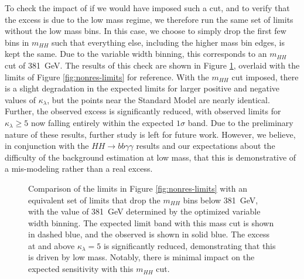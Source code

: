 To check the impact of if we would have imposed such a cut, and to verify that the excess is due to the low mass regime, 
we therefore run the same set of limits without the low mass bins. In this case, we choose to simply drop the 
first few bins in $m_{HH}$ such that everything else, including the higher mass bin edges, is kept the same. Due to 
the variable width binning, this corresponds to an $m_{HH}$ cut of \SI{381}{\GeV}. The results of this check are shown 
in Figure \ref{fig:nonres-limits-with-cut}, overlaid with the limits of Figure \ref{fig:nonres-limits} for reference.
With the $m_{HH}$ cut imposed, there is a slight degradation in the expected limits for larger positive and negative 
values of $\kappa_{\lambda}$, but the points near the Standard Model are nearly identical. Further, the observed excess 
is significantly reduced, with observed limits for $\kappa_{\lambda} \geq 5$ now falling entirely within the expected 
$1\sigma$ band. Due to the preliminary nature of these results, further study is left for future work. However, 
we believe, in conjunction with the $HH\rightarrow bb\gamma\gamma$ results and our expectations about the difficulty 
of the background estimation at low mass, that this is demonstrative of a mis-modeling rather than a real excess. 

\begin{figure}[ht]
  \centering
  \caption{\label{fig:nonres-limits-with-cut} Comparison of the limits in Figure \ref{fig:nonres-limits}
  with an equivalent set of limits that drop the $m_{HH}$ bins below \SI{381}{\GeV}, with the value 
  of \SI{381}{\GeV} determined by the optimized variable width binning. The expected limit band with 
  this mass cut is shown in dashed blue, and the observed is shown in solid blue. The excess 
  at and above $\kappa_{\lambda} = 5$ is significantly reduced, demonstrating that this is driven by 
  low mass. Notably, there is minimal impact on the expected sensitivity with this $m_{HH}$ cut.
  }
\end{figure}
